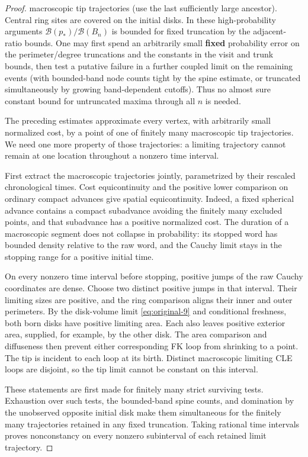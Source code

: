 \begin{proof}
macroscopic tip trajectories (use the last sufficiently large ancestor). Central ring
sites are covered on the initial disks. In these high-probability arguments
\(\mathcal B(p_*)/\mathcal B(B_n)\) is bounded for fixed truncation by the adjacent-ratio
bounds. One may first spend an arbitrarily small \textbf{fixed} probability error on the
perimeter/degree truncations and the constants in the visit and trunk bounds, then test a
putative failure in a further coupled limit on the remaining events (with bounded-band
node counts tight by the spine estimate, or truncated simultaneously by growing
band-dependent cutoffs). Thus no almost sure constant bound for untruncated maxima through
all \(n\) is needed.


The preceding estimates approximate every vertex, with arbitrarily small
normalized cost, by a point of one of finitely many macroscopic tip trajectories.
We need one more property of those trajectories: a limiting trajectory cannot
remain at one location throughout a nonzero time interval.

First extract the macroscopic trajectories jointly, parametrized by their
rescaled chronological times. Cost equicontinuity and the positive lower
comparison on ordinary compact advances give spatial equicontinuity. Indeed,
a fixed spherical advance contains a compact subadvance avoiding the finitely
many excluded points, and that subadvance has a positive normalized cost.
The duration of a macroscopic segment does not collapse in probability:
its stopped word has bounded density relative to the raw word, and the
Cauchy limit stays in the stopping range for a positive initial time.

On every nonzero time interval before stopping, positive jumps of the raw
Cauchy coordinates are dense. Choose two distinct positive jumps in that
interval. Their limiting sizes are positive, and the ring comparison aligns
their inner and outer perimeters. By the disk-volume limit
\eqref{eq:original-9} and conditional freshness, both born disks have positive
limiting area. Each also leaves positive exterior area, supplied, for example,
by the other disk. The area comparison and diffuseness then prevent either
corresponding FK loop from shrinking to a point. The tip is incident to each
loop at its birth. Distinct macroscopic limiting CLE loops are disjoint,
so the tip limit cannot be constant on this interval.

These statements are first made for finitely many strict surviving tests.
Exhaustion over such tests, the bounded-band spine counts, and domination by
the unobserved opposite initial disk make them simultaneous for the finitely
many trajectories retained in any fixed truncation. Taking rational time
intervals proves nonconstancy on every nonzero subinterval of each retained
limit trajectory.


\end{proof}
